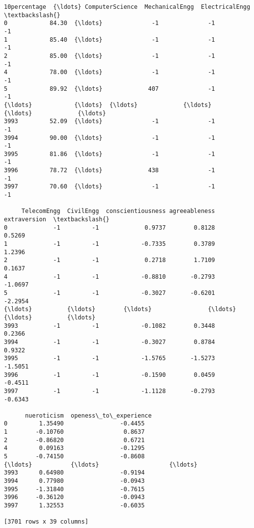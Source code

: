 \documentclass[11pt]{article}
\begin{document}
\begin{tcolorbox}[breakable, size=fbox, boxrule=.5pt, pad at break*=1mm, opacityfill=0]
\begin{Verbatim}[commandchars=\\\{\}]
      10percentage  {\ldots} ComputerScience  MechanicalEngg  ElectricalEngg  \textbackslash{}
0            84.30  {\ldots}              -1              -1              -1
1            85.40  {\ldots}              -1              -1              -1
2            85.00  {\ldots}              -1              -1              -1
4            78.00  {\ldots}              -1              -1              -1
5            89.92  {\ldots}             407              -1              -1
{\ldots}            {\ldots}  {\ldots}             {\ldots}             {\ldots}             {\ldots}
3993         52.09  {\ldots}              -1              -1              -1
3994         90.00  {\ldots}              -1              -1              -1
3995         81.86  {\ldots}              -1              -1              -1
3996         78.72  {\ldots}             438              -1              -1
3997         70.60  {\ldots}              -1              -1              -1

     TelecomEngg  CivilEngg  conscientiousness agreeableness extraversion  \textbackslash{}
0             -1         -1             0.9737        0.8128       0.5269
1             -1         -1            -0.7335        0.3789       1.2396
2             -1         -1             0.2718        1.7109       0.1637
4             -1         -1            -0.8810       -0.2793      -1.0697
5             -1         -1            -0.3027       -0.6201      -2.2954
{\ldots}          {\ldots}        {\ldots}                {\ldots}           {\ldots}          {\ldots}
3993          -1         -1            -0.1082        0.3448       0.2366
3994          -1         -1            -0.3027        0.8784       0.9322
3995          -1         -1            -1.5765       -1.5273      -1.5051
3996          -1         -1            -0.1590        0.0459      -0.4511
3997          -1         -1            -1.1128       -0.2793      -0.6343

      nueroticism  openess\_to\_experience
0         1.35490                -0.4455
1        -0.10760                 0.8637
2        -0.86820                 0.6721
4         0.09163                -0.1295
5        -0.74150                -0.8608
{\ldots}           {\ldots}                    {\ldots}
3993      0.64980                -0.9194
3994      0.77980                -0.0943
3995     -1.31840                -0.7615
3996     -0.36120                -0.0943
3997      1.32553                -0.6035

[3701 rows x 39 columns]
\end{Verbatim}
\end{tcolorbox}
        
\end{document}
